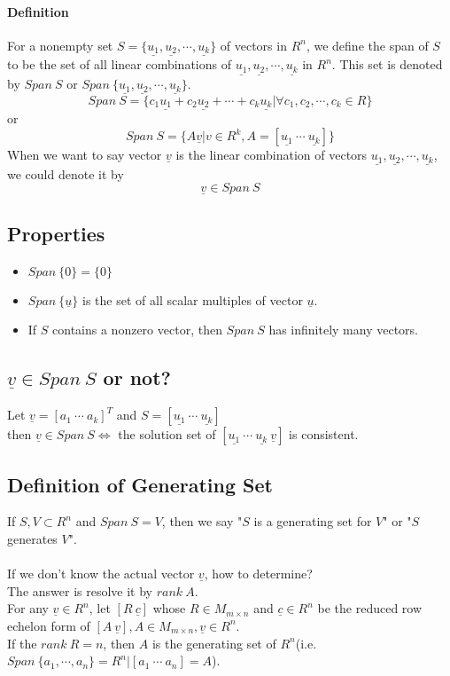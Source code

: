 \documentclass[12pt]{article}
\begin{document}
\paragraph{Definition}
For a nonempty set $S=\lbrace \underline{u_1}, \underline{u_2},\cdots,\underline{u_k} \rbrace$ of vectors in $R^n$, we define the span of $S$ to be the set of all linear combinations of $\underline{u_1}, \underline{u_2},\cdots,\underline{u_k}$ in $R^n$. This set is denoted by $Span\ S$ or $Span \ \lbrace \underline{u_1}, \underline{u_2},\cdots,\underline{u_k} \rbrace$.
$$Span\ S=\lbrace c_1\underline{u_1}+c_2\underline{u_2}+\cdots+c_k\underline{u_k}|\forall c_1,c_2,\cdots,c_k \in R \rbrace$$
or
$$
Span\ S=\lbrace A\underline{v}|v \in R^k , A = [\underline{u_1}\ \cdots\ \underline{u_k}]\rbrace
$$
When we want to say vector $\underline{v}$ is the linear combination of vectors $\underline{u_1}, \underline{u_2},\cdots,\underline{u_k}$, we could denote it by
$$\underline{v} \in Span\ S$$
\subsection{Properties}
\begin{itemize}
\item $Span\ \lbrace 0\rbrace = \lbrace 0\rbrace$
\item $Span\ \lbrace \underline{u}\rbrace$ is the set of all scalar multiples of vector $\underline{u}$. 
\item If $S$ contains a nonzero vector, then $Span\ S$ has infinitely many vectors.
\end{itemize}

\subsection{$\underline{v} \in Span\ S$ or not?}
Let $\underline{v} = [a_1\ \cdots\ a_k]^T$ and  $S=[\underline{u_1}\ \cdots\ \underline{u_k}]$\\
then
$\underline{v} \in Span\ S \Leftrightarrow$
the solution set of $[\underline{u_1}\ \cdots\ \underline{u_k}\  \underline{v}]$ is consistent.

\subsection{Definition of Generating Set}
If $S,V \subset R^n$ and $Span\ S=V$, then we say "$S$ is a generating set for $V$" or "$S$ generates $V$".
\\\\
If we don't know the actual vector $\underline{v}$, how to determine? \\The answer is resolve it by $rank\ A$.\\
For any $\underline{v} \in R^n$, let $[R\ \underline{c}]$ whose $R \in M_{m \times n}$ and $\underline{c} \in R^n$ be the reduced row echelon form of $[A\ \underline{v}], A \in M_{m \times n}, \underline{v} \in R^n$.\\
If the $rank\ R=n$, then $A$ is the generating set of $R^n$(i.e. $Span\ \lbrace a_1,\cdots, a_n\rbrace = R^n | [a_1\ \cdots\ a_n] = A$).
\end{document}
